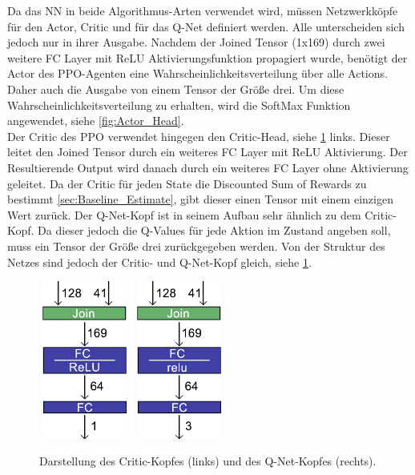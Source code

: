 Da das NN in beide Algorithmus-Arten verwendet wird, müssen Netzwerkköpfe für den Actor, Critic und für das Q-Net definiert werden. Alle unterscheiden sich jedoch nur in ihrer Ausgabe. 
Nachdem der Joined Tensor (1x169) durch zwei weitere FC Layer mit ReLU Aktivierungsfunktion propagiert wurde, benötigt der Actor des PPO-Agenten eine Wahrscheinlichkeitsverteilung über alle Actions. Daher auch die Ausgabe von einem Tensor der Größe drei. Um diese Wahrscheinlichkeitsverteilung zu erhalten, wird die SoftMax Funktion angewendet, siehe \ref{fig:Actor_Head}.\\
Der Critic des PPO verwendet hingegen den Critic-Head, siehe \ref{fig:Critic_Q_Head} links. Dieser leitet den Joined Tensor durch ein weiteres FC Layer mit ReLU Aktivierung. Der Resultierende Output wird danach durch ein weiteres FC Layer ohne Aktivierung geleitet. Da der Critic für jeden State die Discounted Sum of Rewards zu bestimmt \ref{sec:Baseline_Estimate}, gibt dieser einen Tensor mit einem einzigen Wert zurück.
Der Q-Net-Kopf ist in seinem Aufbau sehr ähnlich zu dem Critic-Kopf. Da dieser jedoch die Q-Values für jede Aktion im Zustand angeben soll, muss ein Tensor der Größe drei zurückgegeben werden. Von der Struktur des Netzes sind jedoch der Critic- und Q-Net-Kopf gleich, siehe \ref{fig:Critic_Q_Head}.
\begin{figure}[H]
	\centering
	\includegraphics[width=3cm, height=5.2cm]{Abbildungen/Critic.png}
	\hspace{.3\linewidth}%
	\includegraphics[width=3cm, height=5.2cm]{Abbildungen/QNet.png}
	\caption[Critic- und Q-Net-Head]{Darstellung des Critic-Kopfes (links) und des Q-Net-Kopfes (rechts).}
	\label{fig:Critic_Q_Head}
\end{figure}


